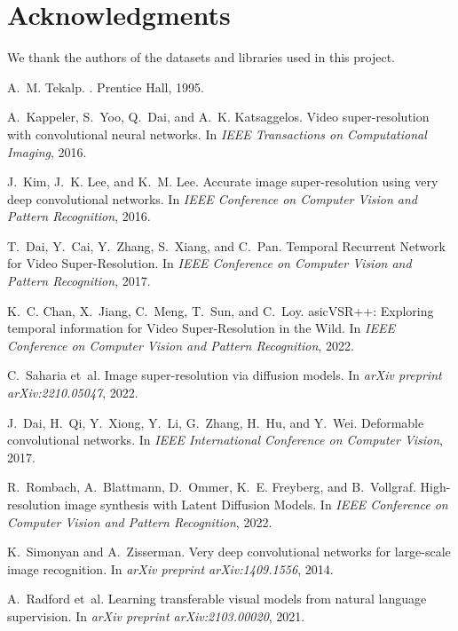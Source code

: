 \documentclass{article}
\begin{document}
\section*{Acknowledgments}
We thank the authors of the datasets and libraries used in this project.

\begin{thebibliography}{9}
A.~M. Tekalp.
.
\newblock Prentice Hall, 1995.

A.~Kappeler, S.~Yoo, Q.~Dai, and A.~K. Katsaggelos.
\newblock Video super-resolution with convolutional neural networks.
\newblock In {\em IEEE Transactions on Computational Imaging}, 2016.

J.~Kim, J.~K. Lee, and K.~M. Lee.
\newblock Accurate image super-resolution using very deep convolutional networks.
\newblock In {\em IEEE Conference on Computer Vision and Pattern Recognition}, 2016.

T.~Dai, Y.~Cai, Y.~Zhang, S.~Xiang, and C.~Pan.
\newblock Temporal {R}ecurrent {N}etwork for {V}ideo {S}uper-{R}esolution.
\newblock In {\em IEEE Conference on Computer Vision and Pattern Recognition}, 2017.

K.~C. Chan, X.~Jiang, C.~Meng, T.~Sun, and C.~Loy.
asic{VSR}++: {E}xploring temporal information for {V}ideo {S}uper-{R}esolution in the {W}ild.
\newblock In {\em IEEE Conference on Computer Vision and Pattern Recognition}, 2022.

C.~Saharia et~al.
\newblock Image super-resolution via diffusion models.
\newblock In {\em arXiv preprint arXiv:2210.05047}, 2022.

J.~Dai, H.~Qi, Y.~Xiong, Y.~Li, G.~Zhang, H.~Hu, and Y.~Wei.
\newblock Deformable convolutional networks.
\newblock In {\em IEEE International Conference on Computer Vision}, 2017.

R.~Rombach, A.~Blattmann, D.~Ommer, K.~E. Freyberg, and B.~Vollgraf.
\newblock High-resolution image synthesis with Latent Diffusion Models.
\newblock In {\em IEEE Conference on Computer Vision and Pattern Recognition}, 2022.

K.~Simonyan and A.~Zisserman.
\newblock Very deep convolutional networks for large-scale image recognition.
\newblock In {\em arXiv preprint arXiv:1409.1556}, 2014.

A.~Radford et~al.
\newblock Learning transferable visual models from natural language supervision.
\newblock In {\em arXiv preprint arXiv:2103.00020}, 2021.
\end{thebibliography}
\end{document}
